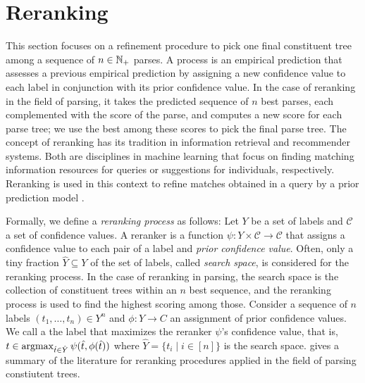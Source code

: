 \documentclass[../../document.tex]{subfiles}
\begin{document}
    \section{Reranking}\label{sec:reranking}
    This section focuses on a refinement procedure to pick one final constituent tree among a sequence of \(n \in \mathbb{N}_+\) parses.
    A  process is an empirical prediction that assesses a previous empirical prediction by assigning a new confidence value to each label in conjunction with its prior confidence value.
    In the case of reranking in the field of parsing, it takes the predicted sequence of \(n\) best parses, each complemented with the score of the parse, and computes a new score for each parse tree; we use the best among these scores to pick the final parse tree.
    The concept of reranking has its tradition in information retrieval and recommender systems. Both are disciplines in machine learning that focus on finding matching information resources for queries or suggestions for individuals, respectively.
    Reranking is used in this context to refine matches obtained in a query by a prior prediction model \citep{carbonell1998use,adomavicius2009toward}.

    Formally, we define a \emph{reranking process} as follows:
        Let \(Y\) be a set of labels and \(\mathcal{C}\) a set of confidence values.
        A reranker is a function \(\psi \colon Y \times \mathcal{C} \to \mathcal{C}\) that assigns a confidence value to each pair of a label and \emph{prior confidence value}.
    Often, only a tiny fraction \(\hat{Y} \subseteq Y\) of the set of labels, called \emph{search space}, is considered for the reranking process.
    In the case of reranking in parsing, the search space is the collection of constituent trees within an \(n\) best sequence, and the reranking process is used to find the highest scoring among those.
    Consider a sequence of \(n\) labels \((t_1, \ldots, t_n) \in Y^n\) and \(\phi \colon Y \to C\) an assignment of prior confidence values.
    We call a  the label that maximizes the reranker \(\psi\)'s confidence value, that is, \(
        t \in \operatorname{arg max}_{\hat{t} \in \hat{Y}} \psi(\hat{t}, \phi(\hat{t}))
    \) where \(\hat{Y} = \{t_i \mid i \in [n]\}\) is the search space.
     gives a summary of the literature for reranking procedures applied in the field of parsing constiutent trees.
\end{document}
